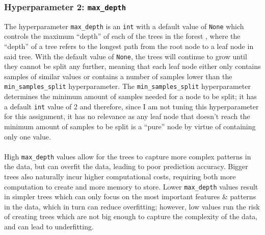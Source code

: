 \documentclass[a4paper, 10pt]{article}
\begin{document}
\subsubsection{Hyperparameter 2: \texttt{max_depth}} The hyperparameter \texttt{max_depth} is an \texttt{int} with a default value of \texttt{None} which controls the maximum ``depth'' of each of the trees in the forest \supercite{scikit_randomforestregressor}, where the ``depth'' of a tree refers to the longest path from the root node to a leaf node in said tree.
With the default value of \texttt{None}, the trees will continue to grow until they cannot be split any further, meaning that each leaf node either only contains samples of similar values or contains a number of samples lower than the \texttt{min_samples_split} hyperparameter.
The \texttt{min_samples_split} hyperparameter determines the minimum amount of samples needed for a node to be split; it has a default \texttt{int} value of 2 and therefore, since I am not tuning this hyperparameter for this assignment, it has no relevance as any leaf node that doesn't reach the minimum amount of samples to be split is a ``pure'' node by virtue of containing only one value.
\\\\
High \texttt{max_depth} values allow for the trees to capture more complex patterns in the data, but can overfit the data, leading to poor prediction accuracy.
Bigger trees also naturally incur higher computational costs, requiring both more computation to create and more memory to store.
Lower \texttt{max_depth} values result in simpler trees which can only focus on the most important features \& patterns in the data, which in turn can reduce overfitting; however, low values run the risk of creating trees which are not big enough to capture the complexity of the data, and can lead to underfitting.
\end{document}
